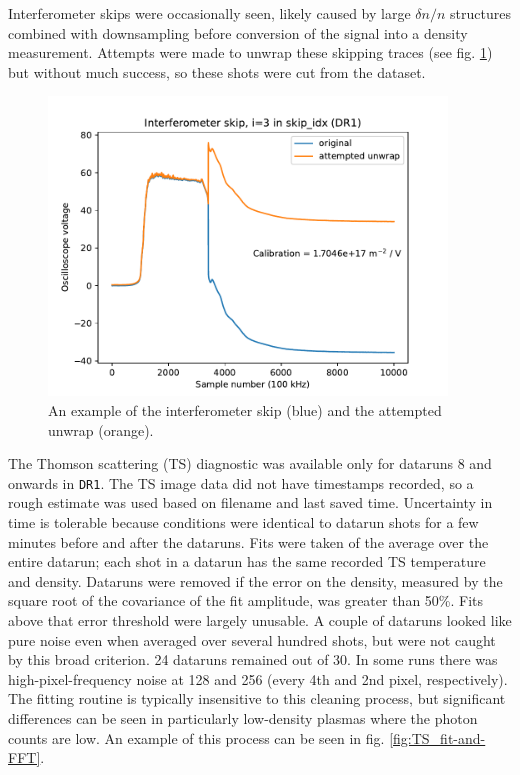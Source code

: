 Interferometer skips were occasionally seen, likely caused by large $\delta n / n$ structures combined with downsampling before conversion of the signal into a density measurement. Attempts were made to unwrap these skipping traces (see fig. \ref{fig:ifo-skip}) but without much success, so these shots were cut from the dataset.

\begin{figure}
	\centering
	\includegraphics[width=300pt]{figures/ifo_skip_example.pdf}
	\caption[Example interferometer skips]{\label{fig:ifo-skip} An example of the interferometer skip (blue) and the attempted unwrap (orange).}
\end{figure}

The Thomson scattering (TS) diagnostic was available only for dataruns 8 and onwards in \texttt{DR1}. The TS image data did not have timestamps recorded, so a rough estimate was used based on filename and last saved time. Uncertainty in time is tolerable because conditions were identical to datarun shots for a few minutes before and after the dataruns. Fits were taken of the average over the entire datarun; each shot in a datarun has the same recorded TS temperature and density. 
Dataruns were removed if the error on the density, measured by the square root of the covariance of the fit amplitude, was greater than 50\%. Fits above that error threshold were largely unusable. A couple of dataruns looked like pure noise even when averaged over several hundred shots, but were not caught by this broad criterion. 24 dataruns remained out of 30.
In some runs there was high-pixel-frequency noise at 128 and 256 (every 4th and 2nd pixel, respectively). The fitting routine is typically insensitive to this cleaning process, but significant differences can be seen in particularly low-density plasmas where the photon counts are low. An example of this process can be seen in fig. \ref{fig:TS_fit-and-FFT}.

